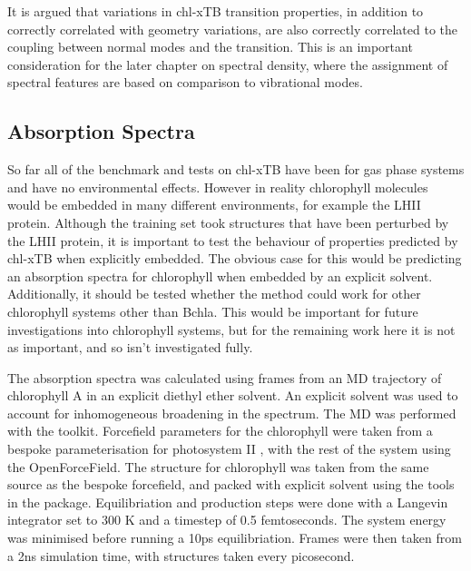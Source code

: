 It is argued that variations in chl-xTB transition properties, in addition to correctly
correlated with geometry variations, are also correctly correlated to the coupling
between normal modes and the \Qy transition. This is an important consideration 
for the later chapter on spectral density, where the assignment of spectral features
are based on comparison to vibrational modes.

\afterpartskip
\subsection{Absorption Spectra}
\label{subsec:absorption_spectra}

So far all of the benchmark and tests on chl-xTB have been for gas phase systems
and have no environmental effects. However in reality chlorophyll molecules would
be embedded in many different environments, for example the LHII protein. Although
the training set took structures that have been perturbed by the LHII protein, it
is important to test the behaviour of properties predicted by chl-xTB when explicitly
embedded. The obvious case for this would be predicting an absorption spectra for
chlorophyll when embedded by an explicit solvent. Additionally, it should be tested
whether the method could work for other chlorophyll systems other than Bchla. This
would be important for future investigations into chlorophyll systems, but for the
remaining work here it is not as important, and so isn't investigated fully.

The absorption spectra was calculated using frames from an MD trajectory of chlorophyll
A in an explicit diethyl ether solvent. An explicit solvent was used to account
for inhomogeneous broadening in the spectrum. The MD was performed with the
 toolkit. Forcefield parameters for the chlorophyll were taken from
a bespoke parameterisation for photosystem II \cite{Zhang2012}, with the rest of
the system using the OpenForceField. The structure for chlorophyll was taken from
the same source as the bespoke forcefield, and packed with explicit solvent using
the tools in the  package. Equilibriation and production steps were 
done with a Langevin integrator set to 300 K  and a timestep of 0.5 femtoseconds.
The system energy was minimised before running a 10ps equilibriation. Frames were
then taken from a 2ns simulation time, with structures taken every picosecond.

